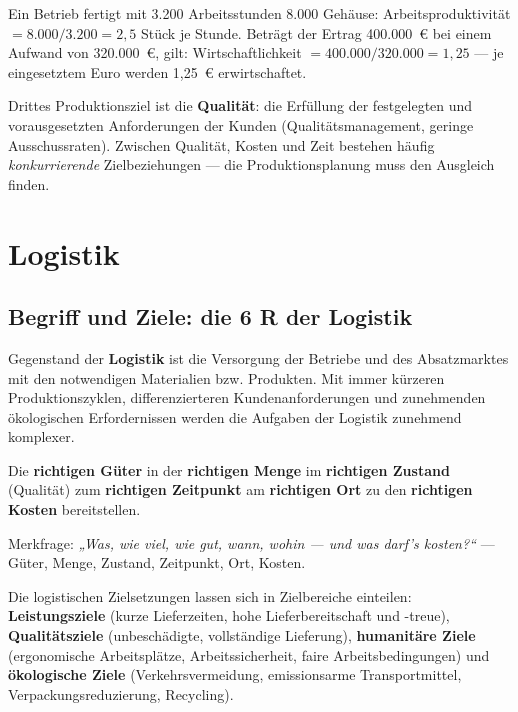 \documentclass[11pt, a4paper]{article}
\begin{document}
\begin{beispiel}
Ein Betrieb fertigt mit 3.200 Arbeitsstunden 8.000 Gehäuse: Arbeitsproduktivität
$= 8.000 / 3.200 = 2{,}5$ Stück je Stunde. Beträgt der Ertrag 400.000~€ bei einem
Aufwand von 320.000~€, gilt: Wirtschaftlichkeit $= 400.000 / 320.000 = 1{,}25$ --- je
eingesetztem Euro werden 1,25~€ erwirtschaftet.
\end{beispiel}

Drittes Produktionsziel ist die \textbf{Qualität}: die Erfüllung der festgelegten und
vorausgesetzten Anforderungen der Kunden (Qualitätsmanagement, geringe Ausschussraten).
Zwischen Qualität, Kosten und Zeit bestehen häufig \emph{konkurrierende}
Zielbeziehungen --- die Produktionsplanung muss den Ausgleich finden.

\section{Logistik}

\subsection{Begriff und Ziele: die 6 R der Logistik}

Gegenstand der \textbf{Logistik} ist die Versorgung der Betriebe und des Absatzmarktes
mit den notwendigen Materialien bzw. Produkten. Mit immer kürzeren Produktionszyklen,
differenzierteren Kundenanforderungen und zunehmenden ökologischen Erfordernissen werden
die Aufgaben der Logistik zunehmend komplexer.

\begin{merksatz}[title={\bfseries Die 6 R der Logistik}]
Die \textbf{richtigen Güter} in der \textbf{richtigen Menge} im \textbf{richtigen
Zustand} (Qualität) zum \textbf{richtigen Zeitpunkt} am \textbf{richtigen Ort} zu den
\textbf{richtigen Kosten} bereitstellen.
\end{merksatz}

\begin{eselsbruecke}
Merkfrage: \emph{„Was, wie viel, wie gut, wann, wohin --- und was darf's kosten?``}
--- Güter, Menge, Zustand, Zeitpunkt, Ort, Kosten.
\end{eselsbruecke}

Die logistischen Zielsetzungen lassen sich in Zielbereiche einteilen:
\textbf{Leistungsziele} (kurze Lieferzeiten, hohe Lieferbereitschaft und -treue),
\textbf{Qualitätsziele} (unbeschädigte, vollständige Lieferung), \textbf{humanitäre
Ziele} (ergonomische Arbeitsplätze, Arbeitssicherheit, faire Arbeitsbedingungen) und
\textbf{ökologische Ziele} (Verkehrsvermeidung, emissionsarme Transportmittel,
Verpackungsreduzierung, Recycling).
\end{document}
